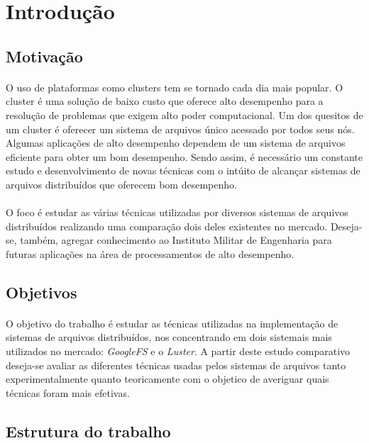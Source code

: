 \section{Introdução}
\subsection{Motivação}
\paragraph{}O uso de plataformas como clusters tem se tornado cada dia mais popular. O cluster é uma solução de baixo custo que oferece alto desempenho para a resolução de problemas que exigem alto poder computacional. Um dos quesitos de um cluster é oferecer um sistema de arquivos único acessado por todos seus nós. Algumas aplicações de alto desempenho dependem de um sistema de arquivos eficiente para obter um bom desempenho. Sendo assim, é necessário um constante estudo e desenvolvimento de novas técnicas com o intúito de alcançar sistemas de arquivos distribuídos que oferecem bom desempenho.

\paragraph{}O foco é estudar as várias técnicas utilizadas por diversos sistemas de arquivos distribuídos realizando uma comparação dois deles existentes no mercado. Deseja-se, também, agregar conhecimento ao Instituto Militar de Engenharia para futuras aplicações na área de processamentos de alto desempenho.

\subsection{Objetivos}
\paragraph{}O objetivo do trabalho é estudar as técnicas utilizadas na implementação de sistemas de arquivos distribuídos, nos concentrando em dois sistemais mais utilizados no mercado: \textit{GoogleFS} e o \textit{Luster}. A partir deste estudo comparativo deseja-se avaliar as diferentes técnicas usadas pelos sistemas de arquivos tanto experimentalmente quanto teoricamente com o objetico de averiguar quais técnicas foram mais efetivas.

\subsection{Estrutura do trabalho}
